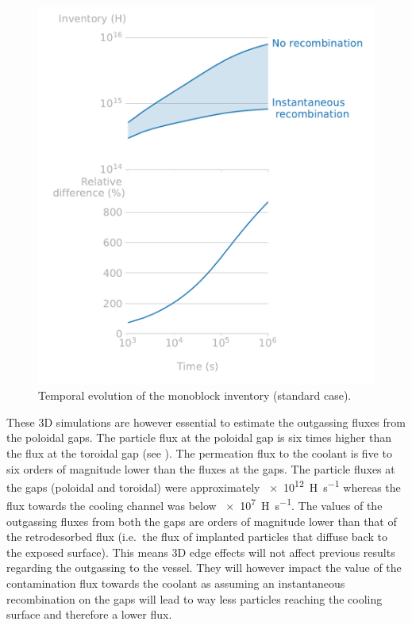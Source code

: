 \begin{figure} [h]
    \centering
    \includegraphics[width=\linewidth]{Figures/Chapter3/monoblocks/3D_monoblocks/inventory_standard_case_w_wo_recomb.pdf}
    \caption{Temporal evolution of the monoblock inventory (standard case).}
\end{figure}

These 3D simulations are however essential to estimate the outgassing fluxes from the poloidal gaps.
The particle flux at the poloidal gap is six times higher than the flux at the toroidal gap  (see ).
The permeation flux to the coolant is five to six orders of magnitude lower than the fluxes at the gaps.
The particle fluxes at the gaps (poloidal and toroidal) were approximately \SI{e12}{H.s^{-1}} whereas the flux towards the cooling channel was below \SI{e7}{H.s^{-1}}.
The values of the outgassing fluxes from both the gaps are orders of magnitude lower than that of the retrodesorbed flux (i.e.\ the flux of implanted particles that diffuse back to the exposed surface).
This means 3D edge effects will not affect previous results regarding the outgassing to the vessel.
They will however impact the value of the contamination flux towards the coolant as assuming an instantaneous recombination on the gaps will lead to way less particles reaching the cooling surface and therefore a lower flux.

